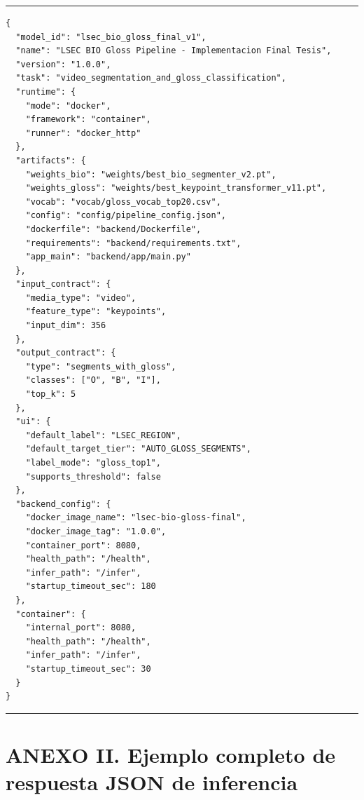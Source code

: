 \documentclass[11pt,a4paper]{article}
\begin{document}
\begin{center}
\begin{minipage}{0.96\textwidth}
\hrule
\vspace{0.06cm}
\scriptsize
\begin{Verbatim}[baselinestretch=0.68]
{
  "model_id": "lsec_bio_gloss_final_v1",
  "name": "LSEC BIO Gloss Pipeline - Implementacion Final Tesis",
  "version": "1.0.0",
  "task": "video_segmentation_and_gloss_classification",
  "runtime": {
    "mode": "docker",
    "framework": "container",
    "runner": "docker_http"
  },
  "artifacts": {
    "weights_bio": "weights/best_bio_segmenter_v2.pt",
    "weights_gloss": "weights/best_keypoint_transformer_v11.pt",
    "vocab": "vocab/gloss_vocab_top20.csv",
    "config": "config/pipeline_config.json",
    "dockerfile": "backend/Dockerfile",
    "requirements": "backend/requirements.txt",
    "app_main": "backend/app/main.py"
  },
  "input_contract": {
    "media_type": "video",
    "feature_type": "keypoints",
    "input_dim": 356
  },
  "output_contract": {
    "type": "segments_with_gloss",
    "classes": ["O", "B", "I"],
    "top_k": 5
  },
  "ui": {
    "default_label": "LSEC_REGION",
    "default_target_tier": "AUTO_GLOSS_SEGMENTS",
    "label_mode": "gloss_top1",
    "supports_threshold": false
  },
  "backend_config": {
    "docker_image_name": "lsec-bio-gloss-final",
    "docker_image_tag": "1.0.0",
    "container_port": 8080,
    "health_path": "/health",
    "infer_path": "/infer",
    "startup_timeout_sec": 180
  },
  "container": {
    "internal_port": 8080,
    "health_path": "/health",
    "infer_path": "/infer",
    "startup_timeout_sec": 30
  }
}
\end{Verbatim}
\vspace{0.03cm}
\hrule

\label{fig:manifest_ejemplo}
\end{minipage}
\end{center}


\section*{\normalfont ANEXO II. Ejemplo completo de respuesta JSON de inferencia}
\label{anx:respuesta_json}
\end{document}
